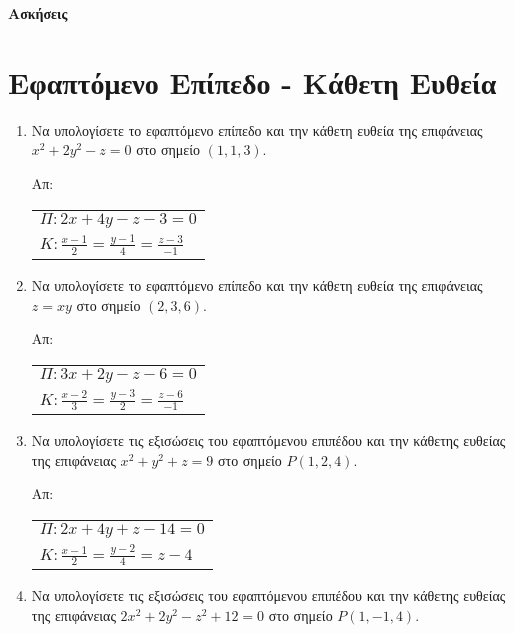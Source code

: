 


\geometry{top=2cm}
\pagestyle{askhseis}
\everymath{\displaystyle}




\begin{center}
  {\color{Col1}\bfseries\large Ασκήσεις}
\end{center} 


 

\section*{Εφαπτόμενο Επίπεδο - Κάθετη Ευθεία}

\begin{enumerate}
  \item Να υπολογίσετε το εφαπτόμενο επίπεδο και την κάθετη ευθεία της επιφάνειας 
    $ x^{2}+2y^{2}-z = 0 $ στο σημείο $ (1,1,3) $.

    \hfill Απ: \begin{tabular}{l}
      $ \Pi : 2x+4y-z -3 = 0 $ \\
      $ K : \frac{x-1}{2} = \frac{y-1}{4} = \frac{z-3}{-1} $
    \end{tabular} 

  \item Να υπολογίσετε το εφαπτόμενο επίπεδο και την κάθετη ευθεία της επιφάνειας 
    $ z = xy $ στο σημείο $ (2,3,6) $.

    \hfill Απ: \begin{tabular}{l}
      $ \Pi : 3x+2y-z-6 = 0 $ \\
      $ K : \frac{x-2}{3} = \frac{y-3}{2} = \frac{z-6}{-1} $
    \end{tabular} 

  \item Να υπολογίσετε τις εξισώσεις του εφαπτόμενου επιπέδου και την κάθετης ευθείας 
    της επιφάνειας $ x^{2} + y^{2} + z = 9 $ στο σημείο $ P(1,2,4) $.

    \hfill Απ: \begin{tabular}{l}
      $ \Pi : 2x+4y+z-14=0 $ \\
      $ K : \frac{x-1}{2} = \frac{y-2}{4} = z-4 $
    \end{tabular} 

  \item Να υπολογίσετε τις εξισώσεις του εφαπτόμενου επιπέδου και την κάθετης ευθείας 
    της επιφάνειας $ 2x^{2} + 2y^{2} - z^{2} +12=0 $ στο σημείο $ P(1,-1,4) $.


\end{enumerate}

